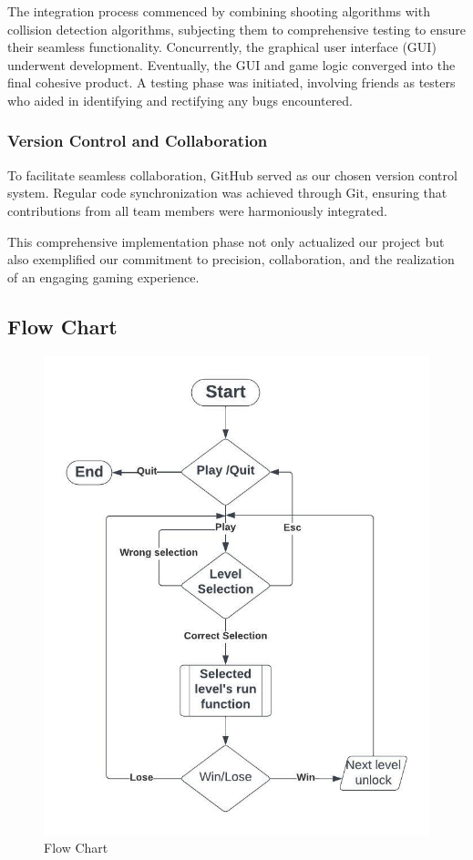 	 		The integration process commenced by combining shooting algorithms with collision detection algorithms, subjecting them to comprehensive testing to ensure their seamless functionality. Concurrently, the graphical user interface (GUI) underwent development. Eventually, the GUI and game logic converged into the final cohesive product. A testing phase was initiated, involving friends as testers who aided in identifying and rectifying any bugs encountered.
	 		
	 \subsubsection{Version Control and Collaboration}
	 
	 		To facilitate seamless collaboration, GitHub served as our chosen version control system. Regular code synchronization was achieved through Git, ensuring that contributions from all team members were harmoniously integrated.
	 		


This comprehensive implementation phase not only actualized our project but also exemplified our commitment to precision, collaboration, and the realization of an engaging gaming experience.

\newpage
\subsection{Flow Chart}

\vspace{2cm}
\begin{figure}[h]
	
	\centering
	\includegraphics{sec/pdf/flowchart}
	\caption{Flow Chart}
\end{figure}

